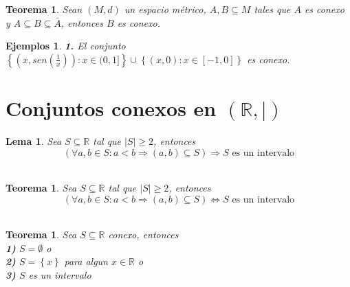 \documentclass[oneside]{book} %
\theoremstyle{Teorema}
\newtheorem{Teorema}[Definicion]{Teorema}
\newtheorem{Lema}[Definicion]{Lema}
\theoremstyle{Ejemplos}
\newtheorem{Ejemplos}[Definicion]{Ejemplos}
\theoremstyle{[Obs]}
\newcommand{\abs}[1]{\left|#1\right|} %
\newcommand{\absSymbol}{\left|\right.} %
\renewcommand{\{}{\left\lbrace} %
\renewcommand{\}}{\right\rbrace} %
\renewcommand{\u}{\cup} %
\renewcommand{\sc}{\subseteq} %
\newcommand{\R}{\mathbb{R}} %
\begin{document}
			\begin{Teorema}
				
				Sean $(M, d)$ un espacio métrico, $A, B \sc M$ tales que $A$ es conexo y $A \sc B \sc \overline{A}$, entonces $B$ es conexo. \\

			\end{Teorema}

			\begin{Ejemplos}
				
				\hfill

				\textbf{1.} El conjunto $\{ (x, sen(\frac{1}{x})) : x \in (0, 1] \} \u \{ (x, 0) : x \in [-1, 0] \}$ es conexo. \\

			\end{Ejemplos}

		\section{Conjuntos conexos en $(\R, \absSymbol)$}

			\begin{Lema}

				Sea $S \sc \R$ tal que $\abs{S} \geq 2$, entonces \\

				\[ \left( \forall a, b \in S: a < b \Rightarrow (a, b) \sc S \right) \Rightarrow S \text{ es un intervalo} \] \\

			\end{Lema}

			\begin{Teorema}

				Sea $S \sc \R$ tal que $\abs{S} \geq 2$, entonces \\

				\[ \left( \forall a, b \in S: a < b \Rightarrow (a, b) \sc S \right) \Leftrightarrow S \text{ es un intervalo} \] \\

			\end{Teorema}

			\begin{Teorema}

				Sea $S \sc \R$ conexo, entonces \\

				\textbf{1)} $S = \emptyset$ o \\

				\textbf{2)} $S = \{ x \}$ para algun $x \in \R$ o \\

				\textbf{3)} $S$ es un intervalo \\

			\end{Teorema}

	\color{white} 
	 
	
		
\end{document}
